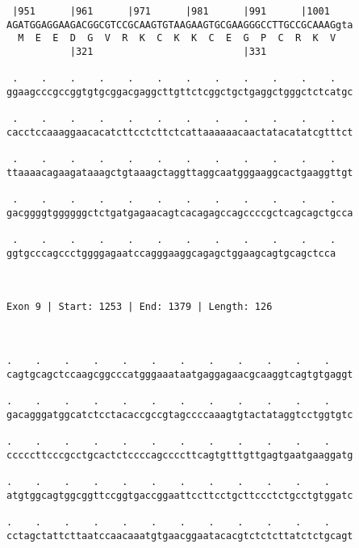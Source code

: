 \documentclass{article}
\begin{document}
\begin{Verbatim}
 |951      |961      |971      |981      |991      |1001    
AGATGGAGGAAGACGGCGTCCGCAAGTGTAAGAAGTGCGAAGGGCCTTGCCGCAAAGgta
  M  E  E  D  G  V  R  K  C  K  K  C  E  G  P  C  R  K  V   
           |321                          |331               
  
 .    .    .    .    .    .    .    .    .    .    .    .   
ggaagcccgccggtgtgcggacgaggcttgttctcggctgctgaggctgggctctcatgc
                                                            
 .    .    .    .    .    .    .    .    .    .    .    .   
cacctccaaaggaacacatcttcctcttctcattaaaaaacaactatacatatcgtttct
                                                            
 .    .    .    .    .    .    .    .    .    .    .    .   
ttaaaacagaagataaagctgtaaagctaggttaggcaatgggaaggcactgaaggttgt
                                                            
 .    .    .    .    .    .    .    .    .    .    .    .   
gacggggtggggggctctgatgagaacagtcacagagccagccccgctcagcagctgcca
                                                            
 .    .    .    .    .    .    .    .    .    .    .    .
ggtgcccagccctggggagaatccagggaaggcagagctggaagcagtgcagctcca
                                                         
                                                         
 
Exon 9 | Start: 1253 | End: 1379 | Length: 126



.    .    .    .    .    .    .    .    .    .    .    .    
cagtgcagctccaagcggcccatgggaaataatgaggagaacgcaaggtcagtgtgaggt
                                                            
.    .    .    .    .    .    .    .    .    .    .    .    
gacagggatggcatctcctacaccgccgtagccccaaagtgtactataggtcctggtgtc
                                                            
.    .    .    .    .    .    .    .    .    .    .    .    
cccccttcccgcctgcactctccccagccccttcagtgtttgttgagtgaatgaaggatg
                                                            
.    .    .    .    .    .    .    .    .    .    .    .    
atgtggcagtggcggttccggtgaccggaattccttcctgcttccctctgcctgtggatc
                                                            
.    .    .    .    .    .    .    .    .    .    .    .    
cctagctattcttaatccaacaaatgtgaacggaatacacgtctctcttatctctgcagt
                                                            

\end{Verbatim}
\end{document}
